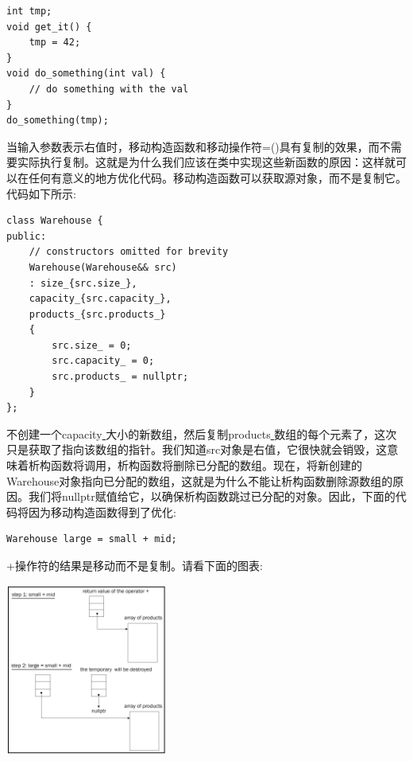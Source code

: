\begin{lstlisting}[caption={}]
int tmp;
void get_it() {
	tmp = 42;
}
void do_something(int val) {
	// do something with the val
}
do_something(tmp);
\end{lstlisting}

当输入参数表示右值时，移动构造函数和移动操作符=()具有复制的效果，而不需要实际执行复制。这就是为什么我们应该在类中实现这些新函数的原因：这样就可以在任何有意义的地方优化代码。移动构造函数可以获取源对象，而不是复制它。代码如下所示: \par

\begin{lstlisting}[caption={}]
class Warehouse {
public:
	// constructors omitted for brevity
	Warehouse(Warehouse&& src)
	: size_{src.size_},
	capacity_{src.capacity_},
	products_{src.products_}
	{
		src.size_ = 0;
		src.capacity_ = 0;
		src.products_ = nullptr;
	}
};
\end{lstlisting}

不创建一个capacity\underline{ }大小的新数组，然后复制products\underline{ }数组的每个元素了，这次只是获取了指向该数组的指针。我们知道src对象是右值，它很快就会销毁，这意味着析构函数将调用，析构函数将删除已分配的数组。现在，将新创建的Warehouse对象指向已分配的数组，这就是为什么不能让析构函数删除源数组的原因。我们将nullptr赋值给它，以确保析构函数跳过已分配的对象。因此，下面的代码将因为移动构造函数得到了优化: \par

\begin{lstlisting}[caption={}]
Warehouse large = small + mid;
\end{lstlisting}

+操作符的结果是移动而不是复制。请看下面的图表:\par

\begin{center}
	\includegraphics[width=0.4\textwidth]{content/Section-1/Chapter-3/10}
\end{center}

